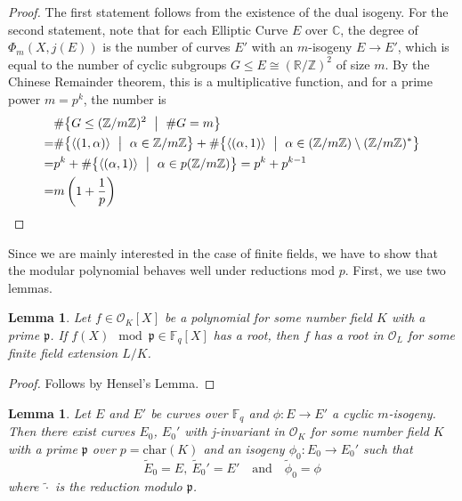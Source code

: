 \documentclass{ociamthesis}
\newcommand{\Z}{\mathbb{Z}}
\newcommand{\F}{\mathbb{F}}
\newcommand{\C}{\mathbb{C}}
\newcommand{\p}{\mathfrak{p}}
\renewcommand{\O}{\mathcal{O}}
\newtheorem{lemma}[prop]{Lemma}
\theoremstyle{definition}
\begin{document}
\begin{proof}
    The first statement follows from the existence of the dual isogeny.
    For the second statement, note that for each Elliptic Curve $E$ over $\C$, the degree of $\Phi_m(X, j(E))$ is the number of curves $E'$ with an $m$-isogeny $E \to E'$, which is equal to the number of cyclic subgroups $G \leq E \cong (\mathbb{R}/\Z)^2$ of size $m$.
    By the Chinese Remainder theorem, this is a multiplicative function, and for a prime power $m = p^k$, the number is
    \begin{align*}
       &\#\bigl\{ G \leq (\Z/m\Z)^2 \ \bigm| \ \#G = m \bigr\} \\
       =& \#\bigl\{ \langle (1, \alpha) \rangle \ \bigm| \ \alpha \in \Z/m\Z \bigr\} + \#\bigl\{ \langle (\alpha, 1) \rangle \ \bigm| \ \alpha \in (\Z/m\Z) \setminus (\Z/m\Z)^* \bigr\} \\
       =& p^k + \#\bigl\{ \langle (\alpha, 1) \rangle \ \bigm| \ \alpha \in p(\Z/m\Z) \bigr\} = p^k + p^{k - 1} \\
       =& m \left( 1 + \frac 1 p \right) \qedhere
    \end{align*}
\end{proof}
Since we are mainly interested in the case of finite fields, we have to show that the modular polynomial behaves well under reductions mod $p$.
First, we use two lemmas.
\begin{lemma}
    \label{prop:modified_hensel_lifting}
    Let $f \in \O_K[X]$ be a polynomial for some number field $K$ with a prime $\p$.
    If $f(X) \mod \p \in \F_q[X]$ has a root, then $f$ has a root in $\O_L$ for some finite field extension $L/K$.
\end{lemma}
\begin{proof}
    Follows by Hensel's Lemma.
\end{proof}
\begin{lemma}
    Let $E$ and $E'$ be curves over $\F_q$ and $\phi: E \to E'$ a cyclic $m$-isogeny.
    Then there exist curves $E_0$, $E_0'$ with j-invariant in $\O_K$ for some number field $K$ with a prime $\p$ over $p = \mathrm{char}(K)$ and an isogeny $\phi_0: E_0 \to E_0'$ such that
    \begin{equation*}
        \tilde{E}_0 = E, \ \tilde{E}_0' = E' \quad \text{and} \quad \tilde{\phi}_0 = \phi
    \end{equation*}
    where $\tilde{\cdot}$ is the reduction modulo $\p$.
\end{lemma}
\end{document}
